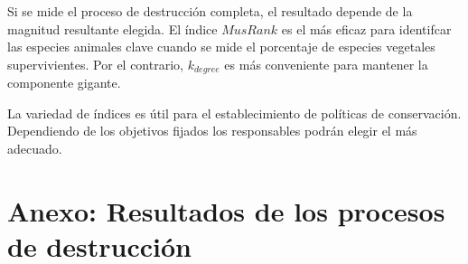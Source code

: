 Si se mide el proceso de destrucción completa, el resultado depende de la magnitud resultante elegida. El índice $MusRank$ es el más eficaz para identifcar las especies animales clave cuando se mide el porcentaje de especies vegetales supervivientes. Por el contrario, ${k}_{degree}$ es más conveniente para mantener la componente gigante.

La variedad de índices es útil para el establecimiento de políticas de conservación. Dependiendo de los objetivos fijados los responsables podrán elegir el más adecuado.

\section{Anexo: Resultados de los procesos de destrucción}
\label{DES_ANEXO_halfgc}

